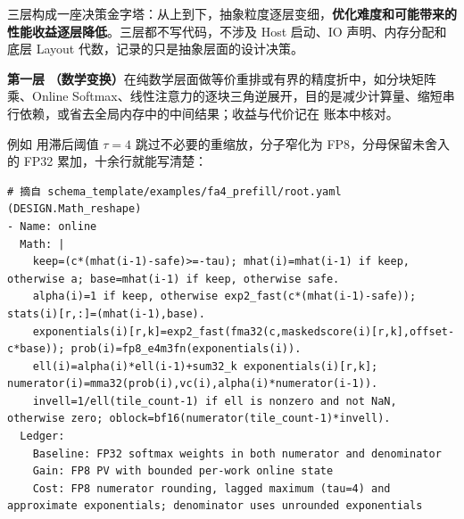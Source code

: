 \begin{DiagramBlock}
\end{DiagramBlock}
三层构成一座决策金字塔：从上到下，抽象粒度逐层变细，\textbf{优化难度和可能带来的性能收益逐层降低}。三层都不写代码，不涉及 Host 启动、IO 声明、内存分配和底层 Layout 代数，记录的只是抽象层面的设计决策。


\textbf{第一层} \textbf{（数学变换）}在纯数学层面做等价重排或有界的精度折中，如分块矩阵乘、Online Softmax、线性注意力的逐块三角逆展开，目的是减少计算量、缩短串行依赖，或省去全局内存中的中间结果；收益与代价记在  账本中核对。

例如  用滞后阈值 $\tau=4$ 跳过不必要的重缩放，分子窄化为 FP8，分母保留未舍入的 FP32 累加，十余行就能写清楚：
\begin{CodeBox}
\begin{Verbatim}[breaklines,breakanywhere,breaksymbolleft={},breaksymbolright={},breakautoindent=true]
# 摘自 schema_template/examples/fa4_prefill/root.yaml (DESIGN.Math_reshape)
- Name: online
  Math: |
    keep=(c*(mhat(i-1)-safe)>=-tau); mhat(i)=mhat(i-1) if keep, otherwise a; base=mhat(i-1) if keep, otherwise safe.
    alpha(i)=1 if keep, otherwise exp2_fast(c*(mhat(i-1)-safe)); stats(i)[r,:]=(mhat(i-1),base).
    exponentials(i)[r,k]=exp2_fast(fma32(c,maskedscore(i)[r,k],offset-c*base)); prob(i)=fp8_e4m3fn(exponentials(i)).
    ell(i)=alpha(i)*ell(i-1)+sum32_k exponentials(i)[r,k]; numerator(i)=mma32(prob(i),vc(i),alpha(i)*numerator(i-1)).
    invell=1/ell(tile_count-1) if ell is nonzero and not NaN, otherwise zero; oblock=bf16(numerator(tile_count-1)*invell).
  Ledger:
    Baseline: FP32 softmax weights in both numerator and denominator
    Gain: FP8 PV with bounded per-work online state
    Cost: FP8 numerator rounding, lagged maximum (tau=4) and approximate exponentials; denominator uses unrounded exponentials
\end{Verbatim}
\end{CodeBox}


